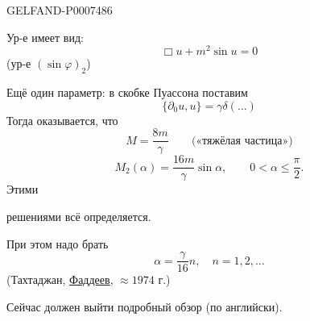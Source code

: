 \begin{GelfandAdjacentEvidence}{GELFAND-P000748}{6}

Ур-е имеет вид:
\begin{equation*}
\Box u+m^2\sin u=0
\tag{20}
\end{equation*}
(ур-е \((\sin\varphi)_2\))

Ещё один параметр: в скобке Пуассона поставим
\begin{equation*}
\{\partial_0u,u\}=\gamma\delta(\ldots)
\tag{21}
\end{equation*}
Тогда оказывается, что
\begin{equation*}
M=\frac{8m}{\gamma}\qquad\text{(«тяжёлая частица»)}
\tag{22}
\end{equation*}
\begin{equation*}
M_2(\alpha)=\frac{16m}{\gamma}\sin\alpha,\qquad 0<\alpha\leq\frac{\pi}{2}.
\tag{23}
\end{equation*}
Этими 
\end{GelfandAdjacentEvidence}

решениями всё определяется.

При этом надо брать
\begin{equation*}
\alpha=\frac{\gamma}{16}n,\quad n=1,2,\ldots
\tag{24}
\end{equation*}
(Тахтаджан, \underline{Фаддеев}, \(\approx1974\) г.)

Сейчас должен выйти подробный обзор (по английски).


